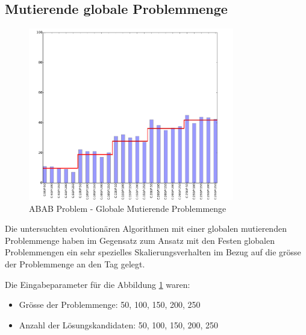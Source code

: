\subsection{Mutierende globale Problemmenge}
\begin{figure}[H]
  \centering
  \includegraphics[width=0.8\textwidth]{images/E_G_abab_solved.pdf}
  \caption[ABAB Problem - Globale Mutierende Problemmenge]{ABAB Problem - Globale Mutierende Problemmenge}
  \label{fig:e_g_abab}
\end{figure}
Die untersuchten evolutionären Algorithmen mit einer globalen mutierenden Problemmenge haben im Gegensatz zum Ansatz mit den Festen globalen Problemmengen ein sehr spezielles Skalierungsverhalten im Bezug auf die grösse der Problemmenge an den Tag gelegt.

Die Eingabeparameter für die Abbildung \ref{fig:e_g_abab} waren:
\begin{itemize}
	\item Grösse der Problemmenge: 50, 100, 150, 200, 250
	\item Anzahl der Lösungskandidaten: 50, 100, 150, 200, 250
\end{itemize}

